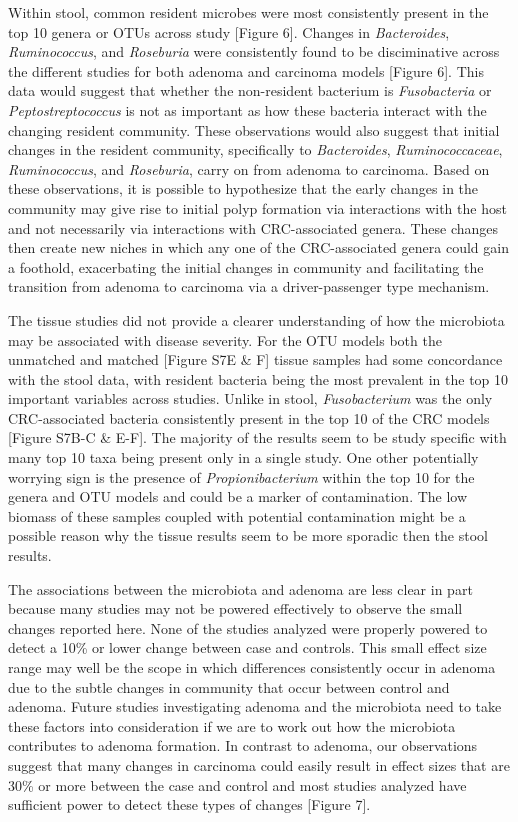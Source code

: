 \documentclass[12pt,]{article}
\begin{document}
Within stool, common resident microbes were most consistently present in
the top 10 genera or OTUs across study {[}Figure 6{]}. Changes in
\emph{Bacteroides}, \emph{Ruminococcus}, and \emph{Roseburia} were
consistently found to be disciminative across the different studies for
both adenoma and carcinoma models {[}Figure 6{]}. This data would
suggest that whether the non-resident bacterium is \emph{Fusobacteria}
or \emph{Peptostreptococcus} is not as important as how these bacteria
interact with the changing resident community. These observations would
also suggest that initial changes in the resident community,
specifically to \emph{Bacteroides}, \emph{Ruminococcaceae},
\emph{Ruminococcus}, and \emph{Roseburia}, carry on from adenoma to
carcinoma. Based on these observations, it is possible to hypothesize
that the early changes in the community may give rise to initial polyp
formation via interactions with the host and not necessarily via
interactions with CRC-associated genera. These changes then create new
niches in which any one of the CRC-associated genera could gain a
foothold, exacerbating the initial changes in community and facilitating
the transition from adenoma to carcinoma via a driver-passenger type
mechanism.

The tissue studies did not provide a clearer understanding of how the
microbiota may be associated with disease severity. For the OTU models
both the unmatched and matched {[}Figure S7E \& F{]} tissue samples had
some concordance with the stool data, with resident bacteria being the
most prevalent in the top 10 important variables across studies. Unlike
in stool, \emph{Fusobacterium} was the only CRC-associated bacteria
consistently present in the top 10 of the CRC models {[}Figure S7B-C \&
E-F{]}. The majority of the results seem to be study specific with many
top 10 taxa being present only in a single study. One other potentially
worrying sign is the presence of \emph{Propionibacterium} within the top
10 for the genera and OTU models and could be a marker of contamination.
The low biomass of these samples coupled with potential contamination
might be a possible reason why the tissue results seem to be more
sporadic then the stool results.

The associations between the microbiota and adenoma are less clear in
part because many studies may not be powered effectively to observe the
small changes reported here. None of the studies analyzed were properly
powered to detect a 10\% or lower change between case and controls. This
small effect size range may well be the scope in which differences
consistently occur in adenoma due to the subtle changes in community
that occur between control and adenoma. Future studies investigating
adenoma and the microbiota need to take these factors into consideration
if we are to work out how the microbiota contributes to adenoma
formation. In contrast to adenoma, our observations suggest that many
changes in carcinoma could easily result in effect sizes that are 30\%
or more between the case and control and most studies analyzed have
sufficient power to detect these types of changes {[}Figure 7{]}.
\end{document}
